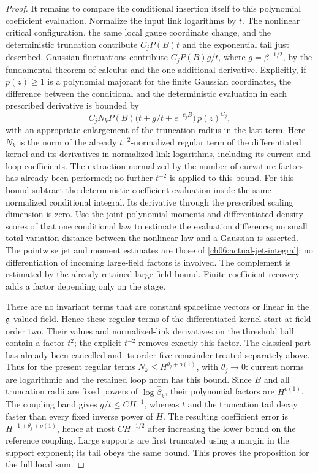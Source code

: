 \begin{proof}
It remains to compare the conditional insertion itself to this
polynomial coefficient evaluation. Normalize the input link logarithms by $t$.
The nonlinear critical configuration, the same local gauge coordinate change,
and the deterministic truncation contribute $C_jP(B)t$ and the exponential
tail just described. Gaussian fluctuations contribute
$C_jP(B)g/t$, where $g=\beta^{-1/2}$, by the fundamental theorem of
calculus and the one additional derivative. Explicitly, if
$p(z)\ge1$ is a polynomial majorant for the finite Gaussian coordinates,
the difference between the conditional and the deterministic evaluation in
each prescribed derivative is bounded by
\[
 C_j N_k P(B)\bigl(t+g/t+e^{-c_jB}\bigr)\,p(z)^{C_j},
\]
with an appropriate enlargement of the truncation radius in the last term.
Here $N_k$ is the norm of the already $t^{-2}$-normalized regular
term of the differentiated kernel and its derivatives in normalized link logarithms, including
its current and loop coefficients. The extraction normalized by the number of curvature factors has
already been performed; no further $t^{-2}$ is applied to this bound. For this bound subtract the deterministic coefficient evaluation
inside the same normalized conditional integral. Its derivative
through the prescribed scaling dimension is zero. Use the joint
polynomial moments and differentiated density scores of that one
conditional law to estimate the evaluation difference; no small
total-variation distance between the nonlinear law and a Gaussian
is asserted. The pointwise jet and moment estimates are those of \eqref{ch06:actual-jet-integral};
no differentiation of incoming large-field factors is involved.
The complement is estimated by the already retained large-field bound. Finite coefficient recovery adds a factor depending only on the stage.

There are no invariant terms that are constant spacetime vectors or linear in the $\mathfrak g$-valued field. Hence these regular terms of the differentiated kernel start at field order two. Their
values and normalized-link derivatives on the threshold ball contain
a factor $t^2$; the explicit $t^{-2}$ removes exactly this factor.
The classical part has already been cancelled and its order-five
remainder treated separately above. Thus for the present regular terms
$N_k\le H^{\theta_j+o(1)}$, with
$\theta_j\to0$: current norms are logarithmic and the retained loop
norm has this bound. Since $B$ and all truncation radii are fixed powers
of $\log\widehat\beta_k$, their polynomial factors are $H^{o(1)}$.
The coupling band gives $g/t\le C H^{-1}$, whereas $t$ and
the truncation tail decay faster than every fixed inverse power of $H$.
The resulting coefficient error is $H^{-1+\theta_j+o(1)}$, hence
at most $CH^{-1/2}$ after increasing the lower bound on the reference coupling. Large supports are first truncated
using a margin in the support exponent; its tail obeys the same
bound. This proves the proposition for the full local sum.
\end{proof}

